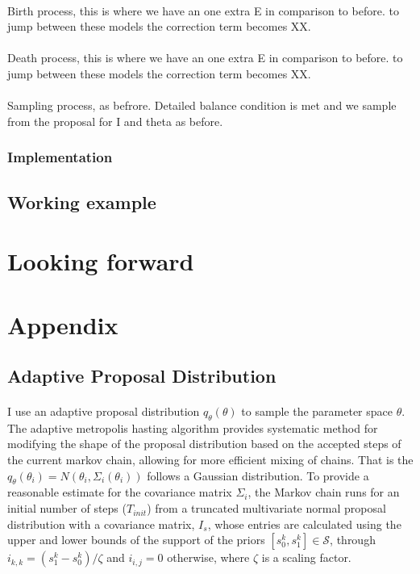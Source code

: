 \documentclass{article}
\begin{document}
\paragraph{}Birth process, this is where we have an one extra E in comparison to before. to jump between these models the correction term becomes XX. 

\paragraph{}Death process, this is where we have an one extra E in comparison to before. to jump between these models the correction term becomes XX. 

\paragraph{}Sampling process, as befrore. Detailed balance condition is met and we sample from the proposal for I and theta as before. 



\subsubsection{Implementation}


\subsection{Working example}


\section{Looking forward}

\section{Appendix}
\subsection{Adaptive Proposal Distribution}

\paragraph{}I use an adaptive proposal distribution $q_\theta(\theta)$ to sample the parameter space $\theta$. The adaptive metropolis hasting algorithm provides systematic method for modifying the shape of the proposal distribution based on the accepted steps of the current markov chain, allowing for more efficient mixing of chains. That is the $q_\theta(\theta_i) = N(\theta_i, \Sigma_i(\theta_i))$ follows a Gaussian distribution. To provide a reasonable estimate for the covariance matrix $\Sigma_i$, the Markov chain runs for an initial number of steps ($T_{init}$) from a truncated multivariate normal proposal distribution with a covariance matrix, $I_s$, whose entries are calculated using the upper and lower bounds of the support of the priors $[s^k_0, s^k_1] \in \mathcal{S}$, through $i_{k,k} = (s^k_1 - s^k_0)/\zeta$ and $i_{i,j} = 0$ otherwise, where $\zeta$ is a scaling factor.
 
\end{document}
